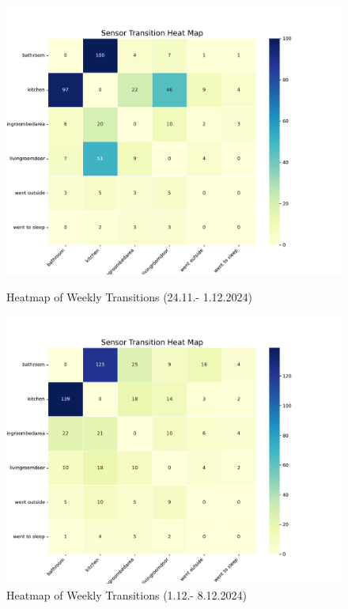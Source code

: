 \documentclass[A4,10pt]{article}
\begin{document}
\begin{figure}[H]
	\centering
	\begin{minipage}{0.45\textwidth}
		\centering 
		\includegraphics[width=\textwidth]{heatmap1.pdf}
		\caption{Heatmap of Weekly Transitions (24.11.- 1.12.2024)}
		\label{fig:heatmap1}
	\end{minipage}\hspace{0.04\textwidth}
	\begin{minipage}{0.45\textwidth}
		\centering
		\includegraphics[width=\textwidth]{heatmap2.pdf}
		\caption{Heatmap of Weekly Transitions (1.12.- 8.12.2024)}
		\label{fig:heatmap2}
	\end{minipage}
\end{figure}
\end{document}
